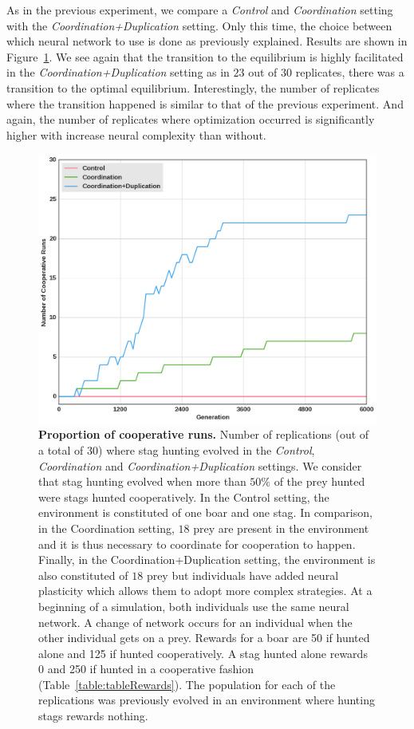     As in the previous experiment, we compare a \emph{Control} and \emph{Coordination} setting with the \emph{Coordination+Duplication} setting. Only this time, the choice between which neural network to use is done as previously explained. Results are shown in Figure~\ref{fig:figRecyclingComNN}. We see again that the transition to the equilibrium is highly facilitated in the \emph{Coordination+Duplication} setting as in $23$ out of $30$ replicates, there was a transition to the optimal equilibrium. Interestingly, the number of replicates where the transition happened is similar to that of the previous experiment. And again, the number of replicates where optimization occurred is significantly higher with increase neural complexity than without.

    \begin{figure}[h]
      \centering
        \includegraphics[width=0.7\linewidth]{fig/ArticleBio2/Fig7.png}
        \caption{\textbf{Proportion of cooperative runs.}
        Number of replications (out of a total of $30$) where stag hunting evolved in the \emph{Control}, \emph{Coordination} and \emph{Coordination+Duplication} settings. We consider that stag hunting evolved when more than $50\%$ of the prey hunted were stags hunted cooperatively. In the Control setting, the environment is constituted of one boar and one stag. In comparison, in the Coordination setting, $18$ prey are present in the environment and it is thus necessary to coordinate for cooperation to happen. Finally, in the Coordination+Duplication setting, the environment is also constituted of $18$ prey but individuals have added neural plasticity which allows them to adopt more complex strategies. At a beginning of a simulation, both individuals use the same neural network. A change of network occurs for an individual when the other individual gets on a prey. Rewards for a boar are 50 if hunted alone and 125 if hunted cooperatively. A stag hunted alone rewards 0 and 250 if hunted in a cooperative fashion (Table~\ref{table:tableRewards}). The population for each of the replications was previously evolved in an environment where hunting stags rewards nothing.}
      \label{fig:figRecyclingComNN}
    \end{figure}


